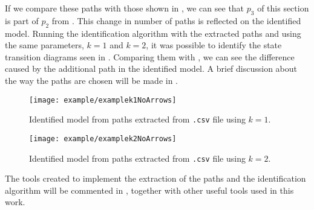 If we compare these paths with those shown in ,
we can see that $p_3$ of this section is part of $p_2$ from
. This change in number of paths is reflected on the
identified model. Running the identification algorithm with the extracted paths and using
the same parameters, $k=1$ and $k=2$, it was possible to identify the state
transition diagrams seen in .
Comparing them with , we can see the difference
caused by the additional path in the identified model. A brief discussion about
the way the paths are chosen will be made in .

\begin{figure}[H]
  \centering
  \texttt{[image: example/examplek1NoArrows]}
  \caption{Identified model from paths extracted from \texttt{.csv} file using $k=1$.}
  \label{fig:identExamplekone}
\end{figure}

\begin{figure}[H]
  \centering
  \centering
  \texttt{[image: example/examplek2NoArrows]}
  \caption{Identified model from paths extracted from \texttt{.csv} file using $k=2$.}
  \label{fig:identExamplektwo}
\end{figure}
The tools created to implement the extraction of the paths and the
identification algorithm will be commented in , together with
other useful tools used in this work.



